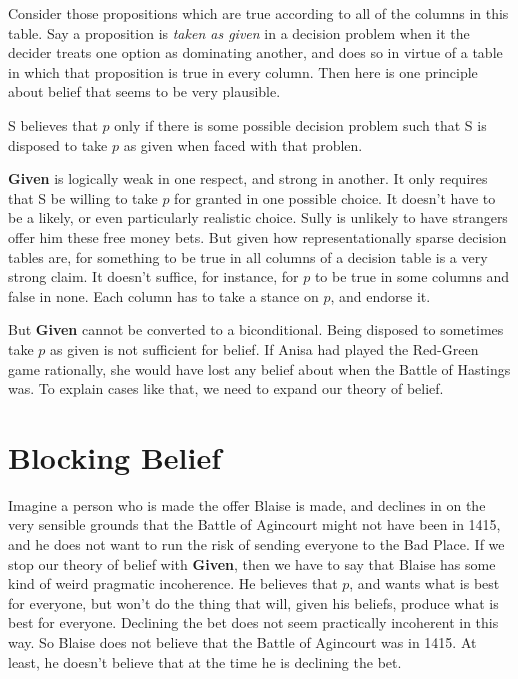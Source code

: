 \documentclass[11pt,]{book}
\providecommand{\tightlist}{%
  \setlength{\itemsep}{0pt}\setlength{\parskip}{0pt}}
\begin{document}
Consider those propositions which are true according to all of the columns in this table. Say a proposition is \emph{taken as given} in a decision problem when it the decider treats one option as dominating another, and does so in virtue of a table in which that proposition is true in every column. Then here is one principle about belief that seems to be very plausible.

\begin{description}
\tightlist
\item[Given]
S believes that \(p\) only if there is some possible decision problem such that S is disposed to take \(p\) as given when faced with that problen.
\end{description}

\textbf{Given} is logically weak in one respect, and strong in another. It only requires that S be willing to take \(p\) for granted in one possible choice. It doesn't have to be a likely, or even particularly realistic choice. Sully is unlikely to have strangers offer him these free money bets. But given how representationally sparse decision tables are, for something to be true in all columns of a decision table is a very strong claim. It doesn't suffice, for instance, for \(p\) to be true in some columns and false in none. Each column has to take a stance on \(p\), and endorse it.

But \textbf{Given} cannot be converted to a biconditional. Being disposed to sometimes take \(p\) as given is not sufficient for belief. If Anisa had played the Red-Green game rationally, she would have lost any belief about when the Battle of Hastings was. To explain cases like that, we need to expand our theory of belief.

\hypertarget{block}{%
\section{Blocking Belief}\label{block}}

Imagine a person who is made the offer Blaise is made, and declines in on the very sensible grounds that the Battle of Agincourt might not have been in 1415, and he does not want to run the risk of sending everyone to the Bad Place. If we stop our theory of belief with \textbf{Given}, then we have to say that Blaise has some kind of weird pragmatic incoherence. He believes that \(p\), and wants what is best for everyone, but won't do the thing that will, given his beliefs, produce what is best for everyone. Declining the bet does not seem practically incoherent in this way. So Blaise does not believe that the Battle of Agincourt was in 1415. At least, he doesn't believe that at the time he is declining the bet.
\end{document}
